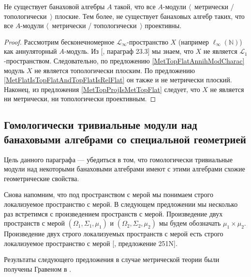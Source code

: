 \begin{proposition} Не существует банаховой алгебры $A$ такой, что все $A$-модули $\langle$~метрически / топологически~$\rangle$ плоские. Тем более, не существует банаховых алгебр таких, что все $A$-модули $\langle$~метрически / топологически~$\rangle$ проективны.
\end{proposition}
\begin{proof} Рассмотрим бесконечномерное $\mathscr{L}_\infty$-пространство $X$ (например $\ell_\infty(\mathbb{N})$) как аннуляторный $A$-модуль. Из [\cite{DefFloTensNorOpId}, параграф 23.3] мы знаем, что $X$ не является $\mathscr{L}_1$-пространством. Следовательно, по предложению \ref{MetTopFlatAnnihModCharac} модуль $X$ не является топологически плоским. По предложению \ref{MetFlatIsTopFlatAndTopFlatIsRelFlat} он также и не метрически плоский. Наконец, из предложения \ref{MetTopProjIsMetTopFlat} следует, что $X$ не является ни метрически, ни топологически проективным.
\end{proof}


\subsection{Гомологически тривиальные модули над банаховыми алгебрами со специальной геометрией}
\label{SubSectionHomologicallyTrivialModulesOverBanachAlgebrasWithSpecificGeometry}

Цель данного параграфа --- убедиться в том, что гомологически тривиальные модули над некоторыми банаховыми алгебрами имеют с этими алгебрами схожие геометрические свойства.

Снова напомним, что под пространством с мерой мы понимаем строго локализуемое пространство с мерой. В следующем предложении мы несколько раз встретимся с произведением пространств с мерой. Произведение двух пространств с мерой $(\Omega_1,\Sigma_1,\mu_1)$ и $(\Omega_2,\Sigma_2,\mu_2)$ мы будем обозначать $\mu_1\times \mu_2$. Произведение двух строго локализуемых пространств с мерой есть  строго локализуемое пространство с мерой [\cite{FremMeasTh}, предложение 251N]. 

Результаты следующего предложения в случае метрической теории были получены Гравеном в \cite{GravInjProjBanMod}.

